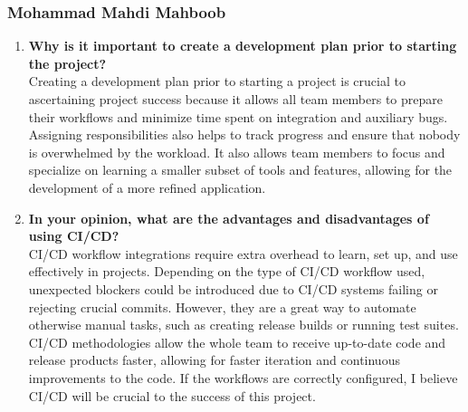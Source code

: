 \documentclass{article}
\begin{document}
\subsubsection*{Mohammad Mahdi Mahboob}
\begin{enumerate}
  \item \textbf{Why is it important to create a development plan prior to starting the
    project?} \\
    Creating a development plan prior to starting a project is crucial to ascertaining project success
    because it allows all team members to prepare their workflows and minimize time spent on integration
    and auxiliary bugs. Assigning responsibilities also helps to track progress and ensure that nobody
    is overwhelmed by the workload. It also allows team members to focus and specialize on learning a
    smaller subset of tools and features, allowing for the development of a more refined application.
  \item \textbf{In your opinion, what are the advantages and disadvantages of using CI/CD?} \\
    CI/CD workflow integrations require extra overhead to learn, set up, and use effectively in
    projects. Depending on the type of CI/CD workflow used, unexpected blockers could be introduced
    due to CI/CD systems failing or rejecting crucial commits. However, they are a great way to
    automate otherwise manual tasks, such as creating release builds or running test suites. CI/CD
    methodologies allow the whole team to receive up-to-date code and release products faster,
    allowing for faster iteration and continuous improvements to the code. If the workflows are
    correctly configured, I believe CI/CD will be crucial to the success of this project.
\end{enumerate}
\end{document}
